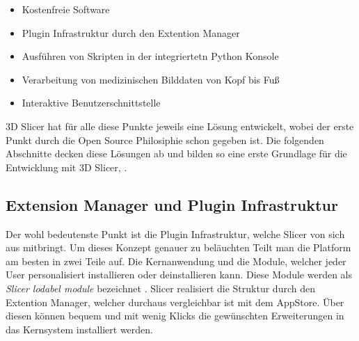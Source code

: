 \begin{itemize}
	\item Kostenfreie Software

	\item Plugin Infrastruktur durch den Extention Manager

	\item Ausführen von Skripten in der integriertetn Python Konsole

	\item Verarbeitung von medizinischen Bilddaten von Kopf bis Fuß

	\item Interaktive Benutzerschnittstelle
\end{itemize}

3D Slicer hat für alle diese Punkte jeweils eine Lösung entwickelt, wobei der
erste Punkt durch die Open Source Philosiphie schon gegeben ist. Die folgenden Abschnitte
decken diese Lösungen ab und bilden so eine erste Grundlage für die Entwicklung mit
3D Slicer\citep[vgl.][]{slicer2024}, \citep[vgl.][]{fedorov2012slicer}.

\subsection{Extension Manager und Plugin Infrastruktur}
Der wohl bedeutenste Punkt ist die Plugin Infrastruktur, welche Slicer von sich
aus mitbringt. Um dieses Konzept genauer zu beläuchten Teilt man die Platform am
besten in zwei Teile auf. Die Kernanwendung und die Module, welcher jeder User personalisiert
installieren oder deinstallieren kann. Diese Module werden als \textit{Slicer
lodabel module} bezeichnet \citep[vgl.][Seite 1332]{fedorov2012slicer}. Slicer
realisiert die Struktur durch den Extention Manager, welcher durchaus vergleichbar
ist mit dem AppStore. Über diesen können bequem und mit wenig Klicks die
gewünschten Erweiterungen in das Kernsystem installiert werden.

